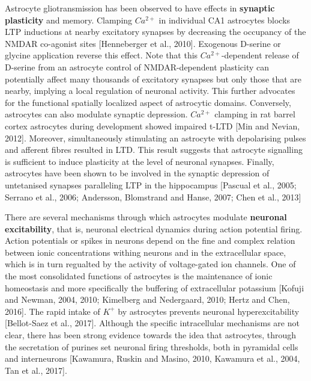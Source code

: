 Astrocyte gliotransmission has been observed to have effects in \textbf{synaptic plasticity} and memory.
Clamping $Ca^{2+}$ in individual CA1 astrocytes blocks LTP inductions at nearby excitatory synapses by decreasing the occupancy of the NMDAR co-agonist sites [Henneberger et al., 2010].
Exogenous D-serine or glycine application reverse this effect.
Note that this $Ca^{2+}$-dependent release of D-serine from an astrocyte control of NMDAR-dependent plasticity can potentially affect many thousands of excitatory synapses but only those that are nearby, implying a local regulation of neuronal activity. 
This further advocates for the functional spatially localized aspect of astrocytic domains.   
Conversely, astrocytes can also modulate synaptic depression. 
$Ca^{2+}$ clamping in rat barrel cortex astrocytes during development showed impaired t-LTD [Min and Nevian, 2012].
Moreover, simultaneously stimulating an astrocyte with depolarising pulses and afferent fibres resulted in LTD.
This result suggests that astrocyte signalling is sufficient to induce plasticity at the level of neuronal synapses. 
Finally, astrocytes have been shown to be involved in the synaptic depression of untetanised synapses paralleling LTP in the hippocampus [Pascual et al., 2005; Serrano et al., 2006; Andersson, Blomstrand and Hanse, 2007; Chen et al., 2013]

There are several mechanisms through which astrocytes modulate \textbf{neuronal excitability}, that is, neuronal electrical dynamics during action potential firing. 
Action potentials or spikes in neurons depend on the fine and complex relation between ionic concentrations withing neurons and in the extracellular space, which is in turn regualted by the activity of voltage-gated ion channels.
One of the most consolidated functions of astrocytes is the maintenance of ionic homeostasis and more specifically the buffering of extracellular potassium [Kofuji and Newman, 2004, 2010; Kimelberg and Nedergaard, 2010; Hertz and Chen, 2016].
The rapid intake of $K^+$ by astrocytes prevents neuronal hyperexcitability [Bellot-Saez et al., 2017]. 
Although the specific intracellular mechanisms are not clear, there has been strong evidence towards the idea that astrocytes, through the secretation of purines set neuronal firing thresholds, both in pyramidal cells and interneurons [Kawamura, Ruskin and Masino, 2010, Kawamura et al., 2004, Tan et al., 2017].

